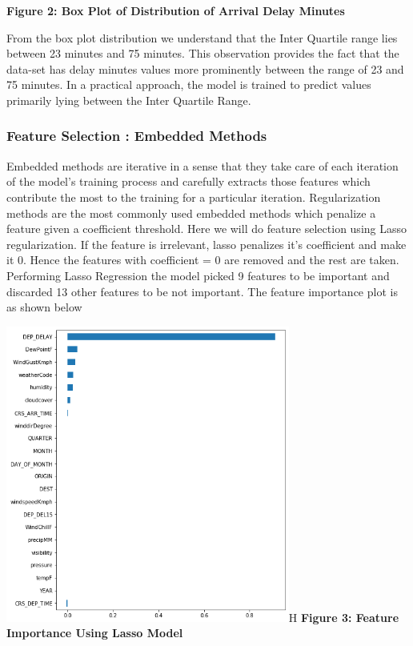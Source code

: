 \documentclass{article}
\begin{document}
\begin{center}
    \textbf{Figure 2: Box Plot of Distribution of Arrival Delay Minutes}
\end{center}

From the box plot distribution we understand that the Inter Quartile range lies between 23 minutes and 75 minutes. This observation provides the fact that the data-set has delay minutes values more prominently  between the range of 23 and 75 minutes. In a practical approach, the model is trained to predict values primarily lying between the Inter Quartile Range. 

\subsubsection{Feature Selection : Embedded Methods}

Embedded methods are iterative in a sense that they take care of each iteration of the model's training process and carefully extracts those features which contribute the most to the training for a particular iteration. Regularization methods are the most commonly used embedded methods which penalize a feature given a coefficient threshold.
Here we will do feature selection using Lasso regularization. If the feature is irrelevant, lasso penalizes it’s coefficient and make it 0. Hence the features with coefficient = 0 are removed and the rest are taken.\\

Performing Lasso Regression the model picked 9 features to be important and discarded 13 other features to be not important. The feature importance plot is as shown below

\begin{center}
  \includegraphics[width=0.7\textwidth]{bar.png}{H}
  \bigbreak
  \textbf{Figure 3: Feature Importance Using Lasso Model}
\end{center}
\end{document}
